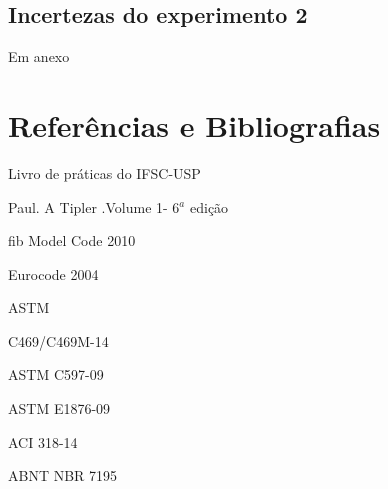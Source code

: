 \documentclass{article}
\begin{document}
\subsection{Incertezas do experimento 2}
Em anexo
\section{Referências e Bibliografias}

 Livro de práticas do IFSC-USP

 Paul. A Tipler .Volume 1- 6$^a $ edição
    
 fib Model Code 2010
 
 Eurocode 2004
 
 ASTM
 
 C469/C469M-14
 
 ASTM C597-09
 
 ASTM E1876-09
 
 ACI 318-14

 ABNT NBR 7195 
\end{document}
